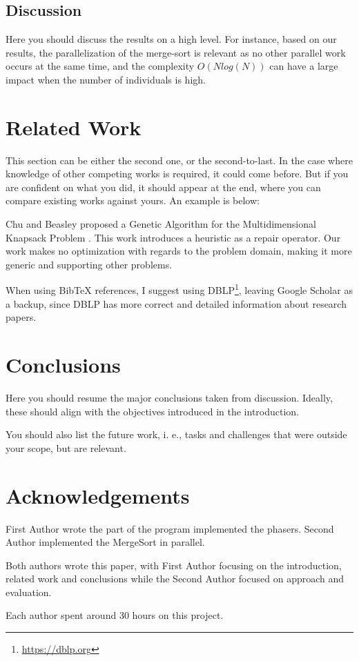 \documentclass[runningheads]{llncs}
\begin{document}
\subsection{Discussion}

Here you should discuss the results on a high level. For instance, based on our results, the parallelization of the merge-sort is relevant as no other parallel work occurs at the same time, and the complexity $O(N log(N))$ can have a large impact when the number of individuals is high.

\section{Related Work}

This section can be either the second one, or the second-to-last. In the case where knowledge of other competing works is required, it could come before. But if you are confident on what you did, it should appear at the end, where you can compare existing works against yours. An example is below:

Chu and Beasley proposed a Genetic Algorithm for the Multidimensional Knapsack Problem \cite{DBLP:journals/heuristics/ChuB98}. This work introduces a heuristic as a repair operator. Our work makes no optimization with regards to the problem domain, making it more generic and supporting other problems.


When using BibTeX references, I suggest using DBLP\footnote{\url{https://dblp.org}}, leaving Google Scholar as a backup, since DBLP has more correct and detailed information about research papers.

\section{Conclusions}

Here you should resume the major conclusions taken from discussion. Ideally, these should align with the objectives introduced in the introduction.


You should also list the future work, i. e., tasks and challenges that were outside your scope, but are relevant.

\section*{Acknowledgements}

First Author wrote the part of the program implemented the phasers. Second Author implemented the MergeSort in parallel. 

Both authors wrote this paper, with First Author focusing on the introduction, related work and conclusions while the Second Author focused on approach and evaluation.

Each author spent around 30 hours on this project.



\end{document}
